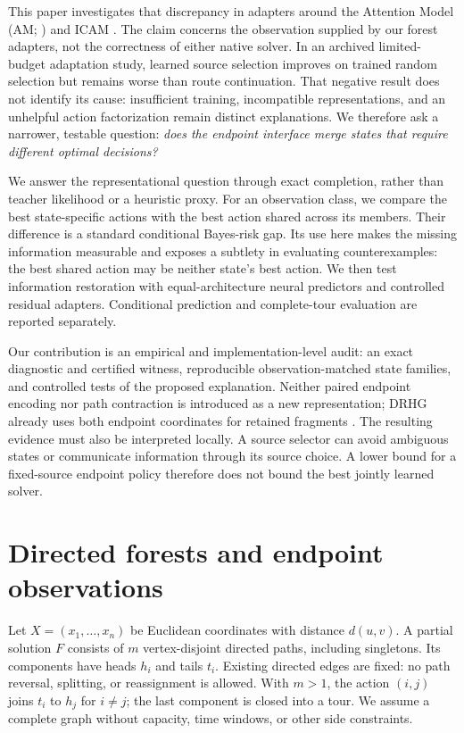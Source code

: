 \documentclass{article}
\begin{document}
This paper investigates that discrepancy in adapters around the Attention
Model (AM; \citealt{kool2019attention}) and ICAM
\citep{zhou2026icam}. The claim concerns the observation supplied by our
forest adapters, not the correctness of either native solver. In an archived
limited-budget adaptation study, learned source selection improves on trained
random selection but remains worse than route continuation. That negative
result does not identify its cause: insufficient training, incompatible
representations, and an unhelpful action factorization remain distinct
explanations. We therefore ask a narrower, testable question: \emph{does the
endpoint interface merge states that require different optimal decisions?}

We answer the representational question through exact completion, rather than
teacher likelihood or a heuristic proxy. For an observation class, we compare
the best state-specific actions with the best action shared across its members.
Their difference is a standard conditional Bayes-risk gap. Its use here makes
the missing information measurable and exposes a subtlety in evaluating
counterexamples: the best shared action may be neither state's best action.
We then test information restoration with equal-architecture neural predictors
and controlled residual adapters. Conditional prediction and complete-tour
evaluation are reported separately.

Our contribution is an empirical and implementation-level audit: an exact
diagnostic and certified witness, reproducible observation-matched state
families, and controlled tests of the proposed explanation. Neither paired
endpoint encoding nor path contraction is introduced as a new representation;
DRHG already uses both endpoint coordinates for retained fragments
\citep{li2025drhg}. The resulting evidence must also be interpreted locally.
A source selector can avoid ambiguous states or communicate information through
its source choice. A lower bound for a fixed-source endpoint policy therefore
does not bound the best jointly learned solver.

\section{Directed forests and endpoint observations}
\label{sec:setup}

Let $X=(x_1,\ldots,x_n)$ be Euclidean coordinates with distance $d(u,v)$.
A partial solution $F$ consists of $m$ vertex-disjoint directed paths, including
singletons. Its components have heads $h_i$ and tails $t_i$. Existing directed
edges are fixed: no path reversal, splitting, or reassignment is allowed. With
$m>1$, the action $(i,j)$ joins $t_i$ to $h_j$ for $i\ne j$; the last component
is closed into a tour. We assume a complete graph without capacity, time windows,
or other side constraints.
\end{document}
